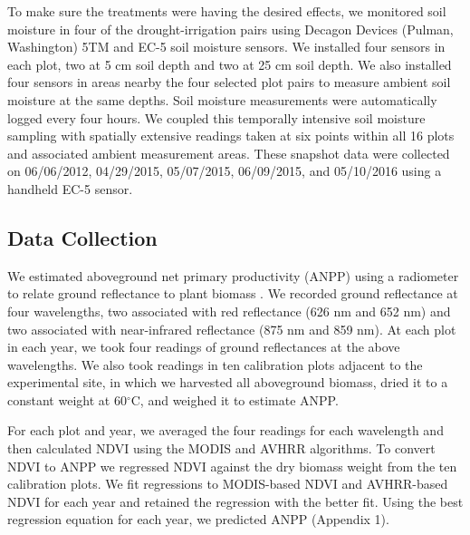 \documentclass[fleqn,10pt,lineno]{wlpeerj} %
\begin{document}
To make sure the treatments were having the desired effects, we
monitored soil moisture in four of the drought-irrigation pairs using
Decagon Devices (Pulman, Washington) 5TM and EC-5 soil moisture sensors.
We installed four sensors in each plot, two at 5 cm soil depth and two
at 25 cm soil depth. We also installed four sensors in areas nearby the
four selected plot pairs to measure ambient soil moisture at the same
depths. Soil moisture measurements were automatically logged every four
hours. We coupled this temporally intensive soil moisture sampling with
spatially extensive readings taken at six points within all 16 plots and
associated ambient measurement areas. These snapshot data were collected
on 06/06/2012, 04/29/2015, 05/07/2015, 06/09/2015, and 05/10/2016 using
a handheld EC-5 sensor.


\subsection{Data Collection}\label{data-collection}

We estimated aboveground net primary productivity (ANPP) using a
radiometer to relate ground reflectance to plant biomass \citep[see][
for a review]{Byrne2011}. We recorded ground reflectance at four
wavelengths, two associated with red reflectance (626 nm and 652 nm) and
two associated with near-infrared reflectance (875 nm and 859 nm). At
each plot in each year, we took four readings of ground reflectances at
the above wavelengths. We also took readings in ten calibration plots
adjacent to the experimental site, in which we harvested all aboveground
biomass, dried it to a constant weight at 60\(^{\circ}\)C, and weighed
it to estimate ANPP.

For each plot and year, we averaged the four readings for each
wavelength and then calculated NDVI using the MODIS and AVHRR
algorithms. To convert NDVI to ANPP we regressed NDVI against the dry
biomass weight from the ten calibration plots. We fit regressions to
MODIS-based NDVI and AVHRR-based NDVI for each year and retained the
regression with the better fit. Using the best regression equation for
each year, we predicted ANPP (Appendix 1).
\end{document}
